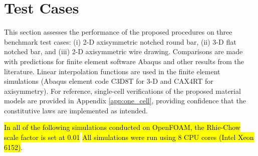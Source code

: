 \documentclass[sn-mathphys,Numbered,draft]{sn-jnl}%
\begin{document}
\section{Test Cases} \label{sec:test_cases}

This section assesses the performance of the proposed procedures on three benchmark test cases: (i) 2-D axisymmetric notched round bar, (ii) 3-D flat notched bar, and (iii) 2-D axisymmetric wire drawing.
Comparisons are made with predictions for finite element software Abaqus and other results from the literature.
Linear interpolation functions are used in the finite element simulations (Abaqus element code C3D8T for 3-D and CAX4RT for axisymmetry).
For reference, single-cell verifications of the proposed material models are provided in Appendix \ref{app:one_cell}, providing confidence that the constitutive laws are implemented as intended.


\hl{In all of the following simulations conducted on OpenFOAM, the Rhie-Chow scale factor is set at 0.01}
\hl{All simulations were run using 8 CPU cores (Intel Xeon 6152)}.
\end{document}
